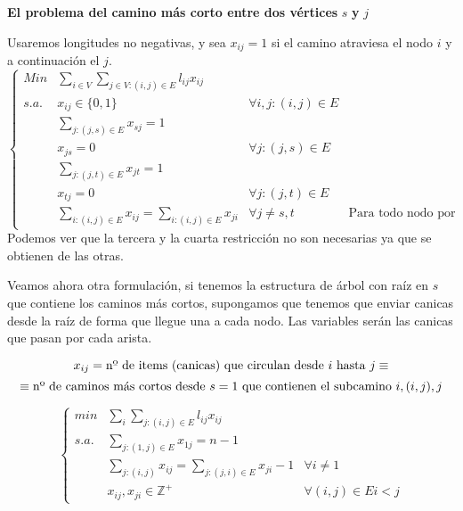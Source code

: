 \documentclass[openany]{book}
\begin{document}
\begin{exercise}
    {\color{turquoise} \textbf{El problema del camino más corto entre dos vértices} $ s $ \textbf{ y } $ j $} 

    Usaremos longitudes no negativas, y sea $ x_{ij} = 1  $ si el camino atraviesa el nodo $ i $ y a continuación el $ j $.
    $$ \left\{
    \begin{array}{llrr}
        Min & \sum\limits_{i \in V}^{}\sum\limits_{j \in V: (i,j) \in E}^{} l_{ij}x_{ij}\\
        s.a. & x_{ij} \in \{0,1\} & \forall i,j: (i,j) \in E\\
        & \sum\limits_{j:(j,s) \in E}^{}x_{sj} = 1 \\
        & x_{js} = 0 & \forall j : (j,s) \in E\\
        & \sum\limits_{j:(j,t) \in E}^{} x_{jt} = 1\\
        & x_{tj} = 0 & \forall j : (j,t) \in E\\
        & \sum\limits_{i:(i,j) \in E}^{} x_{ij} = \sum\limits_{i:(i,j) \in E}^{} x_{ji} & \forall j \ne s,t & \text{Para todo nodo por el que entres, sales}
    \end{array}
    \right. $$
    Podemos ver que la tercera y la cuarta restricción no son necesarias ya que se obtienen de las otras.

    Veamos ahora otra formulación, si tenemos la estructura de árbol con raíz en $ s $ que contiene los caminos más cortos, supongamos que tenemos que enviar canicas desde la raíz de forma que llegue una a cada nodo. Las variables serán las canicas que pasan por cada arista.

    $$ x_{ij} = \text{nº de items (canicas) que circulan desde $ i $ hasta $ j $} \equiv $$$$ \equiv\text{nº de caminos más cortos desde $ s = 1 $ que contienen el subcamino $ i,(i,j),j $}$$


    $$ \left\{
    \begin{array}{llr}
        min & \sum\limits_{i}^{} \sum\limits_{j:(i,j)\in E}^{} l_{ij}x_{ij}\\
        s.a. & \sum\limits_{j:(1,j) \in E}^{} x_{1j} = n-1 \\
        & \sum\limits_{j: (i,j)}^{} x_{ij} = \sum\limits_{j:(j,i) \in E}^{} x_{ji}-1 & \forall i \ne 1\\
        & x_{ij},x_{ji} \in \mathbb{Z} ^{+} & \forall (i,j) \in E i<j
    \end{array}
    \right. $$

\end{exercise}
\end{document}
